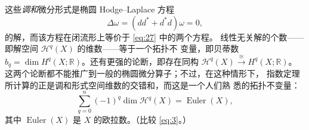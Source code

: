 \documentclass[11pt]{amsart}
\theoremstyle{definition}
\theoremstyle{remark}
\theoremstyle{plain}
\numberwithin{equation}{section}
\renewcommand{\:}{\colon}
\newcommand{\RR}{{\mathbb R}}
\DeclareMathOperator{\coker}{coker}
\DeclareMathOperator{\ind}{ind}
\DeclareMathOperator{\Euler}{Euler}
\DeclareMathOperator{\Todd}{Todd}
\newcommand{\sH}{\mathscr{H}}
\begin{document}
这些{\it 调和\/}微分形式是椭圆 Hodge–Laplace 方程
  \begin{equation}\label{eq:31}
     \Delta \omega = (dd^*+d^*d)\omega =0,
  \end{equation}
的解，而该方程在闭流形上等价于 \eqref{eq:27} 中的两个方程。
线性无关解的个数——即解空间 $\sH^q(X)$ 的维数——等于一个拓扑不
变量，即贝蒂数 $b_q=\dim H^q(X;\RR)$。还有更强的论断，即存在同构
$\sH^q(X)\xrightarrow{\;\cong \;}H^q(X;\RR)$。
这两个论断都不能推广到一般的椭圆微分算子；不过，在这种情形下，
指数定理所计算的正是调和形式空间维数的交错和，而这是一个人们熟
悉的拓扑不变量：
  \begin{equation}\label{eq:32}
     \sum\limits_{q=0}^n (-1)^q\dim\sH^q(X) = \Euler(X),
  \end{equation}
其中 $\Euler(X)$ 是 $X$ 的欧拉数。（比较 \eqref{eq:3}。）
\end{document}
